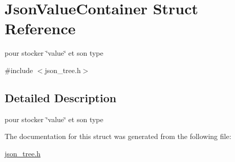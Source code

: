 \hypertarget{structJsonValueContainer}{}\section{Json\+Value\+Container Struct Reference}
\label{structJsonValueContainer}


pour stocker \char`\"{}value\char`\"{} et son type  




{\ttfamily \#include $<$json\+\_\+tree.\+h$>$}



\subsection{Detailed Description}
pour stocker \char`\"{}value\char`\"{} et son type 

The documentation for this struct was generated from the following file\+:\begin{DoxyCompactItemize}
\item 
\hyperlink{json__tree_8h}{json\+\_\+tree.\+h}\end{DoxyCompactItemize}
